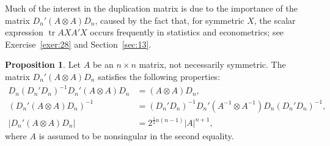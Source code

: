 \documentclass[12pt,a4paper]{article}
\theoremstyle{definition}
\newtheorem{proposition}{Proposition}
\DeclareMathOperator{\tr}{tr}
\begin{document}
Much of the interest in the duplication matrix is due to the importance of the matrix $D_n'(A \otimes A)D_n$, caused by the fact that, for symmetric $X$, the scalar expression $\tr AXA'X$ occurs frequently in statistics and econometrics; see Exercise~\ref{exer:28} and Section~\ref{sec:13}. %

\begin{proposition}\label{prp:10}
Let $A$ be an $n \times n$ matrix, not necessarily symmetric. The matrix $D_n'(A \otimes A)D_n$ satisfies the following properties:
\begin{align*}
D_n(D_n'D_n)^{-1}D_n'(A \otimes A)D_n &= (A \otimes A)D_n, \\
(D_n'(A \otimes A)D_n)^{-1} &= (D_n'D_n)^{-1} D_n'(A^{-1} \otimes A^{-1})D_n(D_n'D_n)^{-1}, \\
|D_n'(A \otimes A)D_n| &= 2^{\frac{1}{2}n(n-1)} |A|^{n+1},
\end{align*}
where $A$ is assumed to be nonsingular in the second equality. %
\end{proposition}
\end{document}
